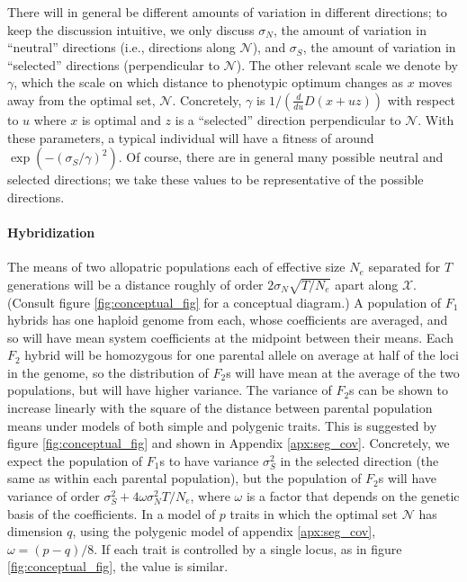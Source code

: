 \documentclass{article}
\newcommand{\plr}[1]{\todo[color=blue!25]{#1}}
\newcommand{\plr}[1]{{\color{blue}\it #1}}
\newcommand{\1}{\mathbbm{1}}
\newcommand{\allS}{\mathcal{N}}
\newcommand{\optx}{\mathcal{X}}
\begin{document}
There will in general be different amounts of variation in different directions;
to keep the discussion intuitive, we only discuss $\sigma_N$, the amount of variation in ``neutral'' directions
(i.e., directions along $\allS$),
and $\sigma_S$, the amount of variation in ``selected'' directions (perpendicular to $\allS$).
The other relevant scale we denote by $\gamma$,
which the scale on which distance to phenotypic optimum changes as $x$ moves away from the optimal set, $\allS$.
Concretely, $\gamma$ is
$1/(\frac{d}{du}D(x+uz))$ 
with respect to $u$ where $x$ is optimal and $z$ is a ``selected'' direction perpendicular to $\allS$.
With these parameters, a typical individual will have a fitness of around $\exp(-(\sigma_S/\gamma)^2)$.
Of course, there are in general many possible neutral and selected directions;
we take these values to be representative of the possible directions.

\paragraph{Hybridization}
The means of two allopatric populations each of effective size $N_e$ separated for $T$ generations
will be a distance roughly of order $2\sigma_N \sqrt{T/N_e}$ apart along $\optx$.
(Consult figure \ref{fig:conceptual_fig} for a conceptual diagram.)
A population of $F_1$ hybrids has one haploid genome from each,
whose coefficients are averaged,
and so will have mean system coefficients at the midpoint between their means.
Each $F_2$ hybrid will be homozygous for one parental allele on average at half of the loci in the genome,
so the distribution of $F_2$s will have mean at the average of the two populations,
but will have higher variance.
The variance of $F_2$s can be shown to increase linearly with the square of the distance between
parental population means
under models of both simple and polygenic traits.
This is suggested by figure \ref{fig:conceptual_fig} and shown in Appendix \ref{apx:seg_cov}.
\plr{connect to Barton etc polygenic adaptation lit}
Concretely, we expect the population of $F_1$s to have variance $\sigma^2_S$ in the selected direction
(the same as within each parental population),
but the population of $F_2$s will have variance of order $\sigma^2_S + 4 \omega \sigma^2_N T/N_e$,
where $\omega$ is a factor that depends on the genetic basis of the coefficients.
In a model of $p$ traits in which the optimal set $\allS$ has dimension $q$,
using the polygenic model of appendix \ref{apx:seg_cov}, $\omega = (p-q)/8$.
If each trait is controlled by a single locus, as in figure \ref{fig:conceptual_fig},
the value is similar.
\end{document}
